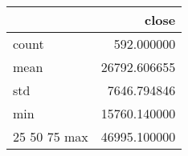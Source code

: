 \begin{tabular}{lr}
\toprule
 & close \\
\midrule
count & 592.000000 \\
mean & 26792.606655 \\
std & 7646.794846 \\
min & 15760.140000 \\
25%
50%
75%
max & 46995.100000 \\
\bottomrule
\end{tabular}

